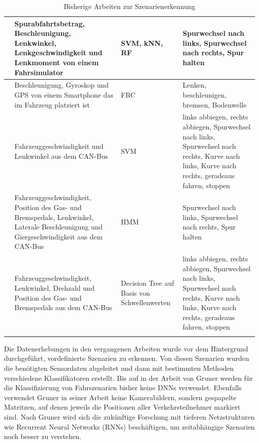 \begin{longtable}[c]{p{} p{4.5cm} p{} p{4.5cm}}
\cite{zheng2016drivers} & Spurabfahrtsbetrag, Beschleunigung, Lenkwinkel, Lenkgeschwindigkeit und Lenkmoment von einem Fahrsimulator & \ac{SVM}, \ac{kNN}, \ac{RF} & Spurwechsel nach links, Spurwechsel nach rechts, Spur halten \\
\hline

\cite{arroyo2016adaptive} & Beschleunigung, Gyroskop und GPS von einem Smartphone das im Fahrzeug platziert ist & \ac{FRC} & Lenken, beschleunigen, bremsen, Bodenwelle \\
\hline

\cite{zheng2015non} & Fahrzeuggeschwindigkeit und Lenkwinkel aus dem CAN-Bus & \ac{SVM} & links abbiegen, rechts abbiegen, Spurwechsel nach links, Spurwechsel nach rechts, Kurve nach links, Kurve nach rechts, geradeaus fahren, stoppen \\
\hline

\cite{li2015lane} & Fahrzeuggeschwindigkeit, Position des Gas- und Bremspedals, Lenkwinkel, Laterale Beschleunigung und Giergeschwindigkeit aus dem CAN-Bus & \ac{HMM} & Spurwechsel nach links, Spurwechsel nach rechts, Spur halten \\
\hline

\cite{zheng2014threshold} & Fahrzeuggeschwindigkeit, Lenkwinkel, Drehzahl und Position des Gas- und Bremspedals aus dem CAN-Bus & Decision Tree auf Basis von Schwellenwerten & links abbiegen, rechts abbiegen, Spurwechsel nach links, Spurwechsel nach rechts, Kurve nach links, Kurve nach rechts, geradeaus fahren, stoppen \\

\hline
\caption{Bisherige Arbeiten zur Szenarienerkennung}
\label{tab_szenarienerkennung}
\end{longtable}

Die Datenerhebungen in den vergangenen Arbeiten wurde vor dem Hintergrund durchgeführt, vordefinierte Szenarien zu erkennen. Von diesen Szenarien wurden die benötigten Sensordaten abgeleitet und dann mit bestimmten Methoden verschiedene Klassifikatoren erstellt. Bis auf in der Arbeit von Gruner \cite{gruner2017spatiotemporal} werden für die Klassifizierung von Fahrszenarien bisher keine \acp{DNN} verwendet. Ebenfalls verwendet Gruner in seiner Arbeit keine Kamerabildern, sondern gespapelte Matritzen, auf denen jeweils die Positionen aller Verkehrsteilnehmer markiert sind. Nach Gruner \cite{gruner2017spatiotemporal} wird sich die zukünftige Forschung mit tieferen Netzstrukturen wie Recurrent Neural Networks (\acp{RNN}) beschäftigen, um zeitabhängige Szenarien noch besser zu verstehen.


